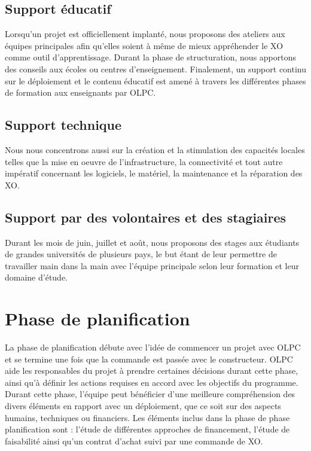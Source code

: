 \documentclass[12pt]{article}
\begin{document}
\subsection{Support éducatif}
\label{sec-5-2}



Lorsqu'un projet est officiellement implanté, nous proposons des ateliers
aux équipes principales afin qu'elles soient à même de mieux appréhender le
XO comme outil d'apprentissage. Durant la phase de structuration, nous
apportons des conseils aux écoles ou centres d'enseignement. Finalement, un
support continu sur le déploiement et le contenu éducatif est amené à
travers les différentes phases de formation aux enseignants par OLPC.
\subsection{Support technique}
\label{sec-5-3}



Nous nous concentrons aussi sur la création et la stimulation des capacités
locales telles que la mise en oeuvre de l'infrastructure, la connectivité et
tout autre impératif concernant les logiciels, le matériel, la maintenance
et la réparation des XO.
\subsection{Support par des volontaires et des stagiaires}
\label{sec-5-4}



Durant les mois de juin, juillet et août, nous proposons des stages aux
étudiants de grandes universités de plusieurs pays, le but étant de leur
permettre de travailler main dans la main avec l'équipe principale selon
leur formation et leur domaine d'étude.
\section{Phase de planification}
\label{sec-6}


La phase de planification débute avec l'idée de commencer un projet avec
OLPC et se termine une fois que la commande est passée avec le
constructeur. OLPC aide les responsables du projet à prendre certaines
décisions durant cette phase, ainsi qu'à définir les actions requises en
accord avec les objectifs du programme. Durant cette phase, l'équipe peut
bénéficier d'une meilleure compréhension des divers éléments en rapport
avec un déploiement, que ce soit sur des aspects humains, techniques ou
financiers. Les éléments inclus dans la phase de phase planification sont :
l'étude de différentes approches de financement, l'étude de faisabilité
ainsi qu'un contrat d'achat suivi par une commande de XO.
\end{document}
